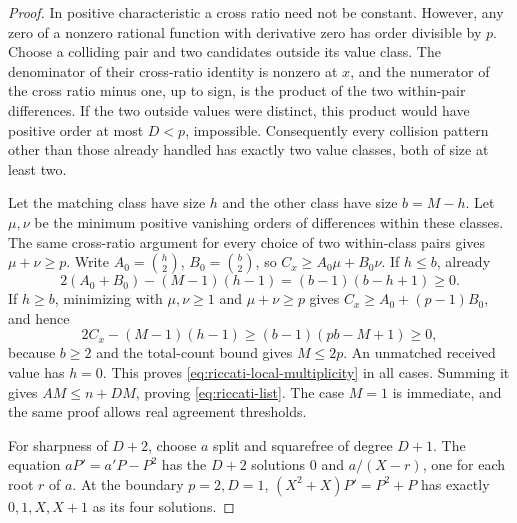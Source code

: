 \begin{proof}
In positive characteristic a cross ratio need not be constant.
However, any zero of a nonzero rational function with derivative
zero has order divisible by $p$. Choose a colliding pair and two
candidates outside its value class. The denominator of their
cross-ratio identity is nonzero at $x$, and the numerator of the
cross ratio minus one, up to sign, is the product of the two
within-pair differences. If the two outside values were distinct,
this product would have positive order at most $D<p$, impossible.
Consequently every collision pattern other than those already
handled has exactly two value classes, both of size at least two.

Let the matching class have size $h$ and the other class have size
$b=M-h$. Let $\mu,\nu$ be the minimum positive vanishing orders of
differences within these classes. The same cross-ratio argument
for every choice of two within-class pairs gives $\mu+\nu\ge p$.
Write $A_0=\binom h2$, $B_0=\binom b2$, so
$C_x\ge A_0\mu+B_0\nu$. If $h\le b$, already
\[
 2(A_0+B_0)-(M-1)(h-1)=(b-1)(b-h+1)\ge0.
\]
If $h\ge b$, minimizing with $\mu,\nu\ge1$ and
$\mu+\nu\ge p$ gives $C_x\ge A_0+(p-1)B_0$, and hence
\[
 2C_x-(M-1)(h-1)\ge(b-1)(pb-M+1)\ge0,
\]
because $b\ge2$ and the total-count bound gives $M\le2p$.
An unmatched received value has $h=0$. This proves
\eqref{eq:riccati-local-multiplicity} in all cases.
Summing it gives $AM\le n+DM$, proving
\eqref{eq:riccati-list}. The case $M=1$ is immediate, and the same
proof allows real agreement thresholds.

For sharpness of $D+2$, choose $a$ split and squarefree of degree
$D+1$. The equation $aP'=a'P-P^2$ has the $D+2$ solutions $0$ and
$a/(X-r)$, one for each root $r$ of $a$. At the boundary $p=2,D=1$,
$(X^2+X)P'=P^2+P$ has exactly $0,1,X,X+1$ as its four solutions.
\end{proof}

